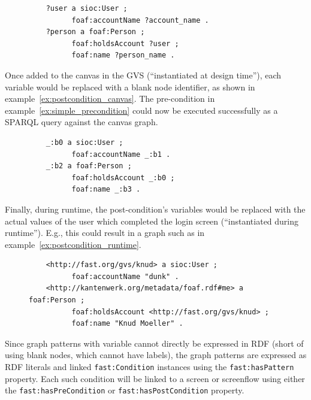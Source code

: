 \documentclass[twoside]{fast_latex}
\begin{document}
\singlespacing
{}
\begin{figure}[ht]
\begin{lstlisting}
	?user a sioc:User ;
	      foaf:accountName ?account_name .
	?person a foaf:Person ;
	      foaf:holdsAccount ?user ;
	      foaf:name ?person_name .
\end{lstlisting}
\end{figure}
\doublespacing

Once added to the canvas in the GVS (``instantiated at design time''), each variable would be replaced with a blank node identifier, as shown in example~\ref{ex:postcondition_canvas}. The pre-condition in example~\ref{ex:simple_precondition} could now be executed successfully as a SPARQL query against the canvas graph.

\singlespacing
{}
\begin{figure}[ht]
\begin{lstlisting}
	_:b0 a sioc:User ;
	      foaf:accountName _:b1 .
	_:b2 a foaf:Person ;
	      foaf:holdsAccount _:b0 ;
	      foaf:name _:b3 .
\end{lstlisting}
\end{figure}
\doublespacing

Finally, during runtime, the post-condition's variables would be replaced with the actual values of the user which completed the login screen (``instantiated during runtime''). E.g., this could result in a graph such as in example~\ref{ex:postcondition_runtime}.

\singlespacing
{}
\begin{figure}[ht]
\begin{lstlisting}
	<http://fast.org/gvs/knud> a sioc:User ;
	      foaf:accountName "dunk" .
	<http://kantenwerk.org/metadata/foaf.rdf#me> a foaf:Person ;
	      foaf:holdsAccount <http://fast.org/gvs/knud> ;
	      foaf:name "Knud Moeller" .
\end{lstlisting}
\end{figure}
\doublespacing

Since graph patterns with variable cannot directly be expressed in RDF (short of using blank nodes, which cannot have labels), the graph patterns are expressed as RDF literals and linked \texttt{fast:Condition} instances using the \texttt{fast:hasPattern} property.
Each such condition will be linked to a screen or screenflow using either the \texttt{fast:has\-PreCondition} or \texttt{fast:has\-Post\-Condition} property.
\end{document}
